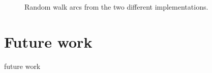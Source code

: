 \documentclass[11pt]{article}
\begin{document}
\begin{figure}[h!]
  \centering
  \hspace{3mm}
  \caption{Random walk arcs from the two different implementations.}
  \label{fig:myArcs}
\end{figure}

\section*{Future work}
future work



\end{document}
